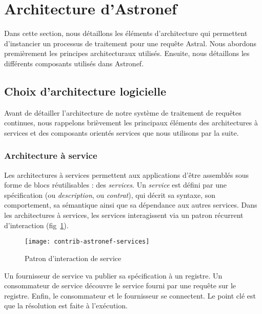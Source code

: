 \section{Architecture d'Astronef}\label{sec:contrib:astronef:architecture}
Dans cette section, nous détaillons les éléments d'architecture qui permettent d'instancier un processus de traitement pour une requête Astral. Nous abordons premièrement les principes architecturaux utilisés. Ensuite, nous détaillons les différents composants utilisés dans Astronef.
\subsection{Choix d'architecture logicielle}
Avant de détailler l'architecture de notre système de traitement de requêtes continues, nous rappelons brièvement les principaux éléments des architectures à services et des composants orientés services que nous utilisons par la suite.
\subsubsection{Architecture à service}
Les architectures à services permettent aux applications d'être assemblés sous forme de blocs réutilisables : des \textit{services}. Un \textit{service} est défini par une spécification (ou \textit{description}, ou \textit{contrat}), qui décrit sa syntaxe, son comportement, sa sémantique ainsi que sa dépendance aux autres services. Dans les architectures à services, les services interagissent via un patron récurrent d'interaction (fig~\ref{fig:contrib:astronef:services}). 
\begin{figure}[ht]
    \centering
    \texttt{[image: contrib-astronef-services]}
    \caption{Patron d'interaction de service}\label{fig:contrib:astronef:services}
\end{figure}
Un fournisseur de service va publier sa spécification à un registre. Un consommateur de service découvre le service fourni par une requête sur le registre. Enfin, le consommateur et le fournisseur se connectent. Le point clé est que la résolution est faite à l'exécution.

